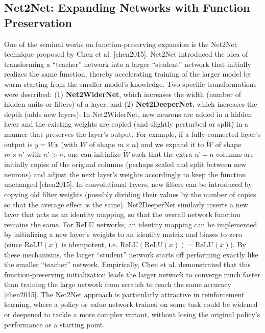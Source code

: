 \subsection{Net2Net: Expanding Networks with Function Preservation}
One of the seminal works on function-preserving expansion is the Net2Net technique proposed by Chen et al. [chen2015]. Net2Net introduced the idea of transforming a “teacher” network into a larger “student” network that initially realizes the same function, thereby accelerating training of the larger model by warm-starting from the smaller model’s knowledge. Two specific transformations were described: (1) \textbf{Net2WiderNet}, which increases the width (number of hidden units or filters) of a layer, and (2) \textbf{Net2DeeperNet}, which increases the depth (adds new layers). In Net2WiderNet, new neurons are added in a hidden layer and the existing weights are copied (and slightly perturbed or split) in a manner that preserves the layer’s output. For example, if a fully-connected layer’s output is $y = W x$ (with $W$ of shape $m \times n$) and we expand it to $\tilde{W}$ of shape $m \times n’$ with $n’ > n$, one can initialize $\tilde{W}$ such that the extra $n’ - n$ columns are initially copies of the original columns (perhaps scaled and split between new neurons) and adjust the next layer’s weights accordingly to keep the function unchanged [chen2015]. In convolutional layers, new filters can be introduced by copying old filter weights (possibly dividing their values by the number of copies so that the average effect is the same). Net2DeeperNet similarly inserts a new layer that acts as an identity mapping, so that the overall network function remains the same. For ReLU networks, an identity mapping can be implemented by initializing a new layer’s weights to an identity matrix and biases to zero (since $\mathrm{ReLU}(x)$ is idempotent, i.e. $\mathrm{ReLU}(\mathrm{ReLU}(x)) = \mathrm{ReLU}(x)$). By these mechanisms, the larger “student” network starts off performing exactly like the smaller “teacher” network. Empirically, Chen et al. demonstrated that this function-preserving initialization leads the larger network to converge much faster than training the large network from scratch to reach the same accuracy [chen2015]. The Net2Net approach is particularly attractive in reinforcement learning, where a policy or value network trained on some task could be widened or deepened to tackle a more complex variant, without losing the original policy’s performance as a starting point.

